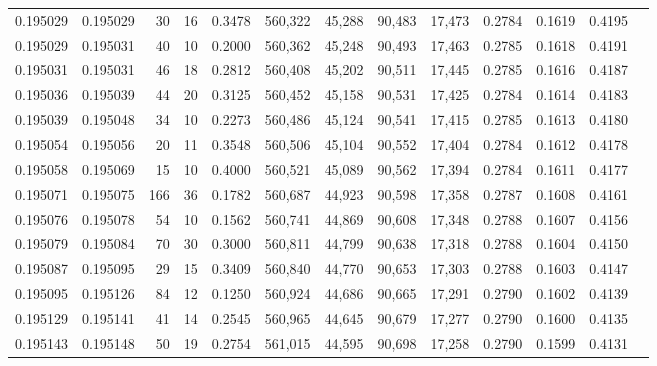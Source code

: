 \begin{tabular}{rrrrrrrrrrrrr}
0.195029 & 0.195029 &    30 &  16 &                                     0.3478 & 560,322 &  45,288 &  90,483 &  17,473 & 0.2784 & 0.1619 & 0.4195 \\
0.195029 & 0.195031 &    40 &  10 &                                     0.2000 & 560,362 &  45,248 &  90,493 &  17,463 & 0.2785 & 0.1618 & 0.4191 \\
0.195031 & 0.195031 &    46 &  18 &                                     0.2812 & 560,408 &  45,202 &  90,511 &  17,445 & 0.2785 & 0.1616 & 0.4187 \\
0.195036 & 0.195039 &    44 &  20 &                                     0.3125 & 560,452 &  45,158 &  90,531 &  17,425 & 0.2784 & 0.1614 & 0.4183 \\
0.195039 & 0.195048 &    34 &  10 &                                     0.2273 & 560,486 &  45,124 &  90,541 &  17,415 & 0.2785 & 0.1613 & 0.4180 \\
0.195054 & 0.195056 &    20 &  11 &                                     0.3548 & 560,506 &  45,104 &  90,552 &  17,404 & 0.2784 & 0.1612 & 0.4178 \\
0.195058 & 0.195069 &    15 &  10 &                                     0.4000 & 560,521 &  45,089 &  90,562 &  17,394 & 0.2784 & 0.1611 & 0.4177 \\
0.195071 & 0.195075 &   166 &  36 &                                     0.1782 & 560,687 &  44,923 &  90,598 &  17,358 & 0.2787 & 0.1608 & 0.4161 \\
0.195076 & 0.195078 &    54 &  10 &                                     0.1562 & 560,741 &  44,869 &  90,608 &  17,348 & 0.2788 & 0.1607 & 0.4156 \\
0.195079 & 0.195084 &    70 &  30 &                                     0.3000 & 560,811 &  44,799 &  90,638 &  17,318 & 0.2788 & 0.1604 & 0.4150 \\
0.195087 & 0.195095 &    29 &  15 &                                     0.3409 & 560,840 &  44,770 &  90,653 &  17,303 & 0.2788 & 0.1603 & 0.4147 \\
0.195095 & 0.195126 &    84 &  12 &                                     0.1250 & 560,924 &  44,686 &  90,665 &  17,291 & 0.2790 & 0.1602 & 0.4139 \\
0.195129 & 0.195141 &    41 &  14 &                                     0.2545 & 560,965 &  44,645 &  90,679 &  17,277 & 0.2790 & 0.1600 & 0.4135 \\
0.195143 & 0.195148 &    50 &  19 &                                     0.2754 & 561,015 &  44,595 &  90,698 &  17,258 & 0.2790 & 0.1599 & 0.4131 \\

\end{tabular}
